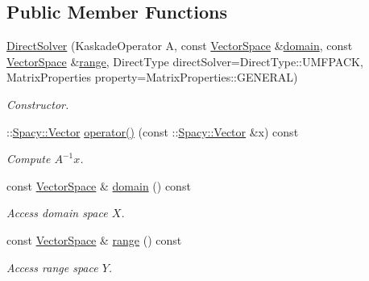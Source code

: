 \subsection*{Public Member Functions}
\begin{DoxyCompactItemize}
\item 
\hyperlink{classSpacy_1_1Kaskade_1_1DirectSolver_ab5611dfb01fb96730c7af6a7cc54b513}{Direct\+Solver} (Kaskade\+Operator A, const \hyperlink{classSpacy_1_1VectorSpace}{Vector\+Space} \&\hyperlink{classSpacy_1_1OperatorBase_a2588f9b3e0188820c4c494e63293dc6f}{domain}, const \hyperlink{classSpacy_1_1VectorSpace}{Vector\+Space} \&\hyperlink{classSpacy_1_1OperatorBase_ab19d3b7a6f290b1079248f1e567e53d6}{range}, Direct\+Type direct\+Solver=Direct\+Type\+::\+U\+M\+F\+P\+A\+C\+K, Matrix\+Properties property=Matrix\+Properties\+::\+G\+E\+N\+E\+R\+A\+L)
\begin{DoxyCompactList}\small\item\em Constructor. \end{DoxyCompactList}\item 
\hypertarget{classSpacy_1_1Kaskade_1_1DirectSolver_ae3b85c906968d662c23bdde7df96ca87}{}\+::\hyperlink{classSpacy_1_1Vector}{Spacy\+::\+Vector} \hyperlink{classSpacy_1_1Kaskade_1_1DirectSolver_ae3b85c906968d662c23bdde7df96ca87}{operator()} (const \+::\hyperlink{classSpacy_1_1Vector}{Spacy\+::\+Vector} \&x) const \label{classSpacy_1_1Kaskade_1_1DirectSolver_ae3b85c906968d662c23bdde7df96ca87}

\begin{DoxyCompactList}\small\item\em Compute $A^{-1}x$. \end{DoxyCompactList}\item 
\hypertarget{classSpacy_1_1OperatorBase_a2588f9b3e0188820c4c494e63293dc6f}{}const \hyperlink{classSpacy_1_1VectorSpace}{Vector\+Space} \& \hyperlink{classSpacy_1_1OperatorBase_a2588f9b3e0188820c4c494e63293dc6f}{domain} () const \label{classSpacy_1_1OperatorBase_a2588f9b3e0188820c4c494e63293dc6f}

\begin{DoxyCompactList}\small\item\em Access domain space $X$. \end{DoxyCompactList}\item 
\hypertarget{classSpacy_1_1OperatorBase_ab19d3b7a6f290b1079248f1e567e53d6}{}const \hyperlink{classSpacy_1_1VectorSpace}{Vector\+Space} \& \hyperlink{classSpacy_1_1OperatorBase_ab19d3b7a6f290b1079248f1e567e53d6}{range} () const \label{classSpacy_1_1OperatorBase_ab19d3b7a6f290b1079248f1e567e53d6}

\begin{DoxyCompactList}\small\item\em Access range space $Y$. \end{DoxyCompactList}\end{DoxyCompactItemize}


